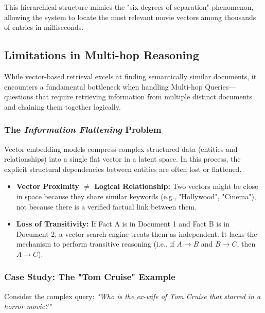 \documentclass[a4paper, 12pt]{extreport}
\begin{document}
This hierarchical structure mimics the "six degrees of separation" phenomenon, allowing the system to locate the most relevant movie vectors among thousands of entries in milliseconds.
    
    \subsection{Limitations in Multi-hop Reasoning}

While vector-based retrieval excels at finding semantically similar documents, it encounters a fundamental bottleneck when handling Multi-hop Queries—questions that require retrieving information from multiple distinct documents and chaining them together logically.

\subsubsection{The \textit{Information Flattening} Problem}
Vector embedding models compress complex structured data (entities and relationships) into a single flat vector in a latent space. In this process, the explicit structural dependencies between entities are often lost or flattened.
\begin{itemize}
    \item \textbf{Vector Proximity $\neq$ Logical Relationship:} Two vectors might be close in space because they share similar keywords (e.g., "Hollywood", "Cinema"), not because there is a verified factual link between them.
    \item \textbf{Loss of Transitivity:} If Fact A is in Document 1 and Fact B is in Document 2, a vector search engine treats them as independent. It lacks the mechanism to perform transitive reasoning (i.e., if $A \rightarrow B$ and $B \rightarrow C$, then $A \rightarrow C$).
\end{itemize}



\subsubsection{Case Study: The "Tom Cruise" Example}
Consider the complex query: \textit{"Who is the ex-wife of Tom Cruise that starred in a horror movie?"}
\end{document}
